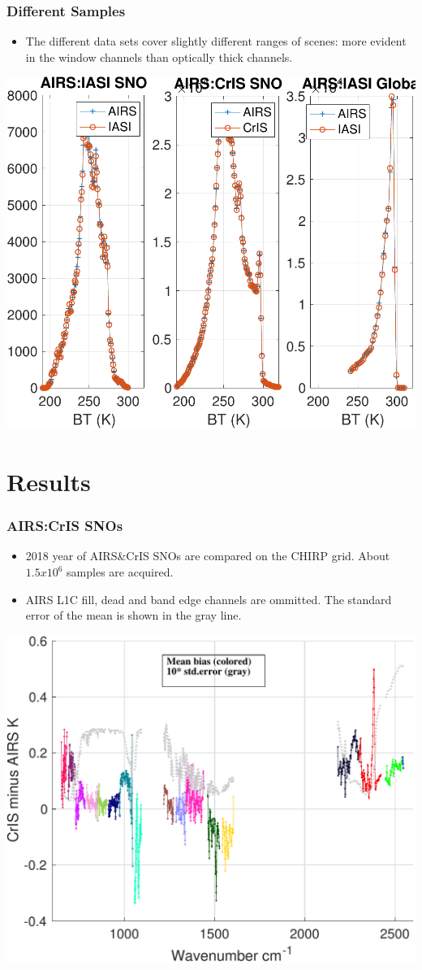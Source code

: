 \documentclass[10pt,t]{beamer}
\begin{document}
\begin{frame}
  \frametitle{Different Samples}
  \begin{itemize}
  \item The different data sets cover slightly different ranges of scenes: more evident in the window channels than optically thick channels.
  \end{itemize}

  \begin{center}
    \includegraphics[width=0.66\linewidth]{./Figs/Pdf/Figsfig4_new.pdf}
  \end{center}

\end{frame}

\section{Results}
\begin{frame}
  \frametitle{AIRS:CrIS SNOs}
  \begin{itemize}
  \item 2018 year of AIRS\&CrIS SNOs are compared on the CHIRP grid. About $1.5 x 10^6$ samples are acquired.
    \item AIRS L1C fill, dead and band edge channels are ommitted. The standard error of the mean is shown in the gray line.
  \end{itemize}

  \begin{center}
    \includegraphics[width=0.66\linewidth]{./Figs/Pdf/ac_sno_2018_bias_stderr_coloraslp.pdf}
  \end{center}

\end{frame}
\end{document}
